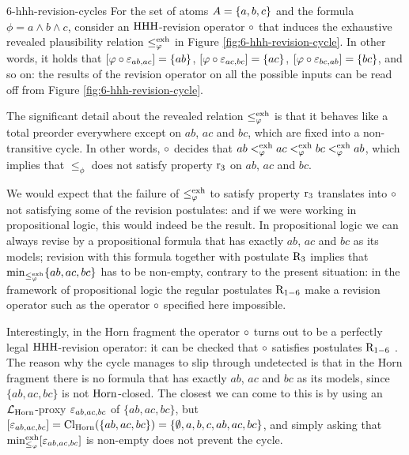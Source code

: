 \begin{xmpl}{\cite{DelgrandeP15,DelgrandePW18}}{6-hhh-revision-cycles}
	For the set of atoms $A=\{a,b,c\}$
	and the formula $\phi=a\land b\land c$,	
	consider an ${\mathrm{HHH}}$-revision operator $\circ$
	that induces the exhaustive revealed plausibility
	relation $\le^{{\operatorname{exh}}}_{\varphi}$ in Figure \ref{fig:6-hhh-revision-cycle}.
	In other words, it holds that 
	$[\varphi\circ\varepsilon_{ab,ac}]=\{ab\}$,
	$[\varphi\circ\varepsilon_{ac,bc}]=\{ac\}$,
	$[\varphi\circ\varepsilon_{bc,ab}]=\{bc\}$,
	and so on:
	the results of the revision operator on
	all the possible inputs can be read off 
	from Figure \ref{fig:6-hhh-revision-cycle}.

	The significant detail about the 
	revealed relation $\le^{{\operatorname{exh}}}_{\varphi}$
	is that it 
	behaves like a total preorder everywhere 
	except on $ab$, $ac$ and $bc$,
	which are fixed into a non-transitive cycle.
	In other words, $\circ$ decides
	that $ab <^{{\operatorname{exh}}}_{\varphi} ac <^{{\operatorname{exh}}}_{\varphi} bc <^{{\operatorname{exh}}}_{\varphi} ab$,
	which implies that $\le_{\phi}$ does not satisfy property $\mathrm{r}_{3}$
	on $ab$, $ac$ and $bc$.

	We would expect that the failure of $\le^{{\operatorname{exh}}}_{\varphi}$ to 
	satisfy property $\mathrm{r}_{3}$
	translates into $\circ$ 
	not satisfying some of the revision postulates:
	and if we were working in propositional logic,
	this would indeed be the result.
	In propositional logic we can always revise by a 
	propositional formula
	that has exactly $ab$, $ac$ and $bc$ as its models;
	revision with this formula 
	together with postulate $\mathrm{R}_{3}$ 
	implies that ${\operatorname{min}}_{\le^{{\operatorname{exh}}}_{\varphi}}\{ab,ac,bc\}$
	has to be non-empty,
	contrary to the present situation:
	in the framework of propositional logic 
	the regular postulates $\mathrm{R}_{1-6}$ make 
	a revision operator such as the operator $\circ$ specified here 
	impossible.

	Interestingly, in the Horn fragment the operator $\circ$
	turns out to be a perfectly legal ${\mathrm{HHH}}$-revision operator:
	it can be checked that $\circ$ satisfies postulates $\mathrm{R}_{1-6}$
	\cite{DelgrandeP15,DelgrandePW18}.
	The reason why the cycle manages to slip through undetected
	is that in the Horn fragment there is no formula
	that has exactly $ab$, $ac$ and $bc$ as its models,
	since $\{ab,ac,bc\}$ is not $\mathrm{Horn}$-closed.
	The closest we can come to this is by 
	using an $\mathcal{L}_{\mathrm{Horn}}$-proxy 
	$\varepsilon_{ab,ac,bc}$ of $\{ab,ac,bc\}$,
	but $[\varepsilon_{ab,ac,bc}]={\operatorname{Cl}}_{\mathrm{Horn}}(\{ab,ac,bc\})=\{\emptyset,a,b,c,ab,ac,bc\}$,
	and simply asking 
	that ${\operatorname{min}}^{{\operatorname{exh}}}_{\le_{\varphi}}[\varepsilon_{ab,ac,bc}]$ is non-empty 
	does not prevent the cycle.
	

\end{xmpl}
